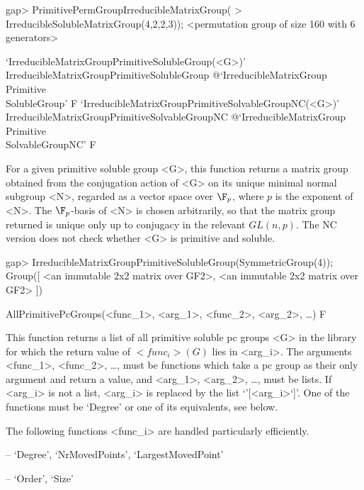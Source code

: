 \beginexample
gap> PrimitivePermGroupIrreducibleMatrixGroup(
>       IrreducibleSolubleMatrixGroup(4,2,2,3));
<permutation group of size 160 with 6 generators>
\endexample

\>`IrreducibleMatrixGroupPrimitiveSolubleGroup(<G>)'%
{IrreducibleMatrixGroupPrimitiveSolubleGroup}%
@{`IrreducibleMatrixGroup\\Primitive\\SolubleGroup'} F
\>`IrreducibleMatrixGroupPrimitiveSolvableGroupNC(<G>)'%
{IrreducibleMatrixGroupPrimitiveSolvableGroupNC}%
@{`IrreducibleMatrixGroup\\Primitive\\SolvableGroupNC'} F

For a given primitive soluble group <G>, this function returns a matrix group 
obtained from the conjugation
action of <G> on its unique minimal normal subgroup <N>, regarded as a vector 
space over $\F_p$, where $p$ is the exponent of <N>. 
The $\F_p$-basis of <N> is chosen arbitrarily, so that the matrix group returned 
is unique only up to conjugacy in the relevant $GL(n, p)$. The NC version does
not check whether <G> is primitive and soluble.

\beginexample
gap> IrreducibleMatrixGroupPrimitiveSolubleGroup(SymmetricGroup(4));
Group([ <an immutable 2x2 matrix over GF2>, 
  <an immutable 2x2 matrix over GF2> ])
\endexample

\null


\>AllPrimitivePcGroups(<func_1>, <arg_1>, <func_2>, <arg_2>, \dots) F

This function returns a list of all primitive soluble pc
groups <G> in the  {\IRREDSOL} library for which the return value of $<func_i>(G)$ lies
in <arg_i>.  The arguments <func_1>, <func_2>, \dots,
must be {\GAP} functions which take a pc group as their only argument and return a
value, and <arg_1>, <arg_2>,
\dots,  must be lists. If <arg_i> is not a list, <arg_i> is replaced by the list
`'[<arg_i>`]'. One of the functions must be `Degree' or one of its
equivalents, see below.

The following functions <func_i> are handled particularly efficiently.

\beginlist%
\item{--} `Degree', `NrMovedPoints', `LargestMovedPoint'
\item{--} `Order', `Size'
\endlist

